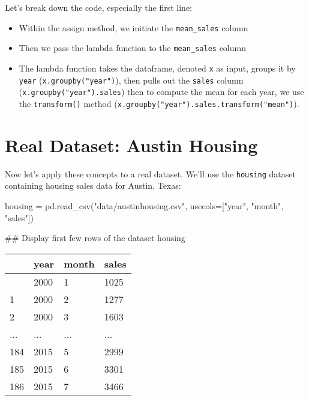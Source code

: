 \documentclass[
  letterpaper,
  DIV=11,
  numbers=noendperiod]{scrreprt}
\newenvironment{Shaded}{\begin{snugshade}}{\end{snugshade}}
\newcommand{\CommentTok}[1]{\textcolor[rgb]{0.37,0.37,0.37}{#1}}
\newcommand{\NormalTok}[1]{\textcolor[rgb]{0.00,0.23,0.31}{#1}}
\newcommand{\OperatorTok}[1]{\textcolor[rgb]{0.37,0.37,0.37}{#1}}
\newcommand{\StringTok}[1]{\textcolor[rgb]{0.13,0.47,0.30}{#1}}
\providecommand{\tightlist}{%
  \setlength{\itemsep}{0pt}\setlength{\parskip}{0pt}}\usepackage{longtable,booktabs,array}
\begin{document}
Let's break down the code, especially the first line:

\begin{itemize}
\tightlist
\item
  Within the assign method, we initiate the \texttt{mean\_sales} column
\item
  Then we pass the lambda function to the \texttt{mean\_sales} column
\item
  The lambda function takes the dataframe, denoted \texttt{x} as input,
  groups it by \texttt{year} (\texttt{x.groupby("year")}), then pulls
  out the \texttt{sales} column (\texttt{x.groupby("year").sales}) then
  to compute the mean for each year, we use the \texttt{transform()}
  method (\texttt{x.groupby("year").sales.transform("mean")}).
\end{itemize}

\section{Real Dataset: Austin
Housing}\label{real-dataset-austin-housing}

Now let's apply these concepts to a real dataset. We'll use the
\texttt{housing} dataset containing housing sales data for Austin,
Texas:

\begin{Shaded}
\begin{Highlighting}[]
\NormalTok{housing }\OperatorTok{=}\NormalTok{ pd.read\_csv(}\StringTok{"data/austinhousing.csv"}\NormalTok{, usecols}\OperatorTok{=}\NormalTok{[}\StringTok{"year"}\NormalTok{, }\StringTok{"month"}\NormalTok{, }\StringTok{"sales"}\NormalTok{])}

\CommentTok{\#\# Display first few rows of the dataset}
\NormalTok{housing}
\end{Highlighting}
\end{Shaded}

\begin{longtable}[]{@{}llll@{}}
\toprule\noalign{}
& year & month & sales \\
\midrule\noalign{}
\endhead
\bottomrule\noalign{}
\endlastfoot
0 & 2000 & 1 & 1025 \\
1 & 2000 & 2 & 1277 \\
2 & 2000 & 3 & 1603 \\
... & ... & ... & ... \\
184 & 2015 & 5 & 2999 \\
185 & 2015 & 6 & 3301 \\
186 & 2015 & 7 & 3466 \\
\end{longtable}
\end{document}

